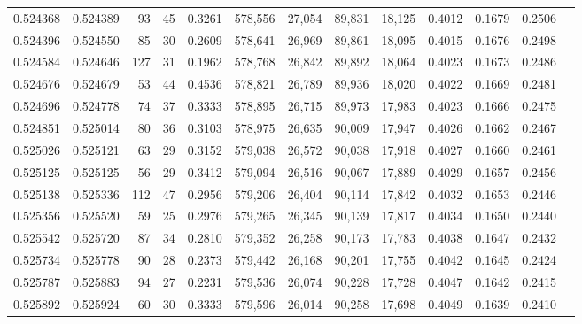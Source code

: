 \begin{tabular}{rrrrrrrrrrrrr}
0.524368 & 0.524389 &    93 &    45 &                                     0.3261 & 578,556 &  27,054 &  89,831 &  18,125 & 0.4012 & 0.1679 & 0.2506 \\
0.524396 & 0.524550 &    85 &    30 &                                     0.2609 & 578,641 &  26,969 &  89,861 &  18,095 & 0.4015 & 0.1676 & 0.2498 \\
0.524584 & 0.524646 &   127 &    31 &                                     0.1962 & 578,768 &  26,842 &  89,892 &  18,064 & 0.4023 & 0.1673 & 0.2486 \\
0.524676 & 0.524679 &    53 &    44 &                                     0.4536 & 578,821 &  26,789 &  89,936 &  18,020 & 0.4022 & 0.1669 & 0.2481 \\
0.524696 & 0.524778 &    74 &    37 &                                     0.3333 & 578,895 &  26,715 &  89,973 &  17,983 & 0.4023 & 0.1666 & 0.2475 \\
0.524851 & 0.525014 &    80 &    36 &                                     0.3103 & 578,975 &  26,635 &  90,009 &  17,947 & 0.4026 & 0.1662 & 0.2467 \\
0.525026 & 0.525121 &    63 &    29 &                                     0.3152 & 579,038 &  26,572 &  90,038 &  17,918 & 0.4027 & 0.1660 & 0.2461 \\
0.525125 & 0.525125 &    56 &    29 &                                     0.3412 & 579,094 &  26,516 &  90,067 &  17,889 & 0.4029 & 0.1657 & 0.2456 \\
0.525138 & 0.525336 &   112 &    47 &                                     0.2956 & 579,206 &  26,404 &  90,114 &  17,842 & 0.4032 & 0.1653 & 0.2446 \\
0.525356 & 0.525520 &    59 &    25 &                                     0.2976 & 579,265 &  26,345 &  90,139 &  17,817 & 0.4034 & 0.1650 & 0.2440 \\
0.525542 & 0.525720 &    87 &    34 &                                     0.2810 & 579,352 &  26,258 &  90,173 &  17,783 & 0.4038 & 0.1647 & 0.2432 \\
0.525734 & 0.525778 &    90 &    28 &                                     0.2373 & 579,442 &  26,168 &  90,201 &  17,755 & 0.4042 & 0.1645 & 0.2424 \\
0.525787 & 0.525883 &    94 &    27 &                                     0.2231 & 579,536 &  26,074 &  90,228 &  17,728 & 0.4047 & 0.1642 & 0.2415 \\
0.525892 & 0.525924 &    60 &    30 &                                     0.3333 & 579,596 &  26,014 &  90,258 &  17,698 & 0.4049 & 0.1639 & 0.2410 \\

\end{tabular}
